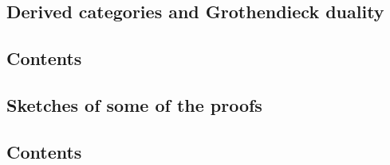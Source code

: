 \documentclass[oneside,openany,a4paper]{memoir}
\begin{document}
\begin{refsection}
  \chapter{Derived categories and Grothendieck duality}

  

  \startcontents[chapters]
  \section*{Contents}
  \clearpage

  
  \clearpage

  \printbibliography[heading=subbibliography]
\end{refsection}


\begin{refsection}
  \chapter{Sketches of some of the proofs}

  

  \startcontents[chapters]
  \section*{Contents}
  \clearpage

  
  \clearpage

  \printbibliography[heading=subbibliography]
\end{refsection}
\end{document}

